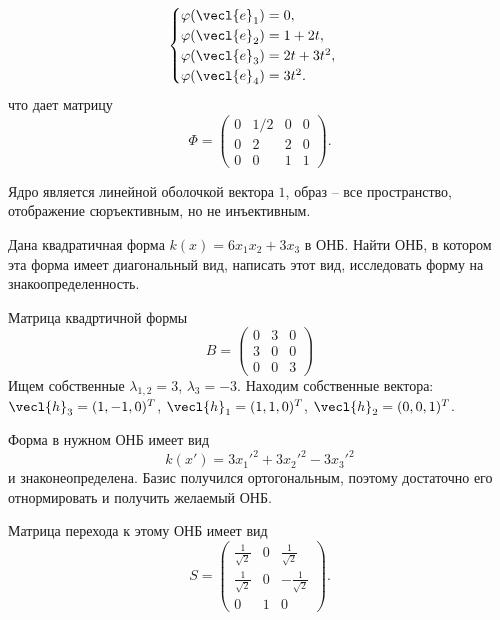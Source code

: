 \begin{equation*}
    \begin{cases}
        \varphi(\vecl{e}_1) = 0, \\ \varphi(\vecl{e}_2) = 1 + 2t, \\ \varphi(\vecl{e}_3) = 2t + 3t^2, \\ \varphi(\vecl{e}_4) = 3t^2.
    \end{cases}
\end{equation*}
что дает матрицу 
\begin{equation*}
    \Phi = \begin{pmatrix}
        0 & 1/2 & 0 & 0\\
        0 & 2 & 2 & 0\\
        0 & 0 & 1 & 1
    \end{pmatrix}.
\end{equation*}

Ядро является линейной оболочкой вектора $1$, образ -- все пространство, отображение сюръективным, но не инъективным.

\begin{task}
    Дана квадратичная форма $k(x) = 6x_1x_2 + 3x_3$ в ОНБ. Найти ОНБ, в котором эта форма имеет диагональный вид, написать этот вид, исследовать форму на знакоопределенность.
\end{task}

Матрица квадртичной формы
\begin{equation*}
    B = \begin{pmatrix}
        0 & 3 & 0 \\ 3 & 0 & 0 \\ 0 & 0 & 3
    \end{pmatrix}
\end{equation*}
Ищем собственные $\lambda_{1, 2} = 3$, $\lambda_3 = -3$. Находим собственные вектора: $\vecl{h}_3 = (1, -1, 0)^T$, $\vecl{h}_1 = (1, 1, 0)^T$, $\vecl{h}_2 = (0, 0, 1)^T$.

Форма в нужном ОНБ имеет вид
\begin{equation*}
    k(x') = 3x_1'^2 + 3x_2'^2 - 3x_3'^2
\end{equation*}
и знаконеопределена. Базис получился ортогональным, поэтому достаточно его отнормировать и получить желаемый ОНБ.

Матрица перехода к этому ОНБ имеет вид
\begin{equation*}
    S = \begin{pmatrix}
        \frac{1}{\sqrt 2} & 0 & \frac{1}{\sqrt 2} \\ \frac{1}{\sqrt 2} & 0 & -\frac{1}{\sqrt 2} \\ 0 & 1 & 0
    \end{pmatrix}.
\end{equation*}

